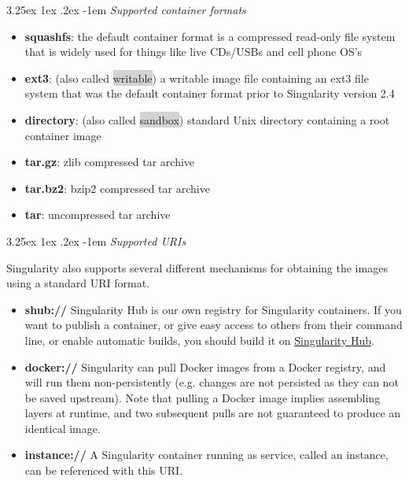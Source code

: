 \documentclass[a4paper]{article}
\makeatletter
\newcounter{subsubsubsection}[subsubsection]
\renewcommand\paragraph{\@startsection{paragraph}{5}{\z@}%
  {3.25ex \@plus1ex \@minus.2ex}%
  {-1em}%
  {\normalfont\normalsize\bfseries}}
\makeatother
\begin{document}
\paragraph{\textit{Supported container formats}}
\begin{itemize}	
	\item \textbf{squashfs}: the default container format is a compressed read-only file system that is widely used for things like live CDs/USBs and cell phone OS’s
\item \textbf{ext3}: (also called \colorbox{lightgray}{writable}) a writable image file containing an ext3 file system that was the default container format prior to Singularity version 2.4
\item \textbf{directory}: (also called \colorbox{lightgray}{sandbox}) standard Unix directory containing a root container image
\item \textbf{tar.gz}: zlib compressed tar archive
\item \textbf{tar.bz2}: bzip2 compressed tar archive
\item \textbf{tar}: uncompressed tar archive
\end{itemize}
\paragraph{\textit{Supported URIs}}
	
	Singularity also supports several different mechanisms for obtaining the images using a standard URI format.

\begin{itemize}
\item \textbf{shub://} Singularity Hub is our own registry for Singularity containers. If you want to publish a container, or give easy access to others from their command line, or enable automatic builds, you should build it on \href{https://singularity-hub.org/}{Singularity Hub}.
\item \textbf{docker://} Singularity can pull Docker images from a Docker registry, and will run them non-persistently (e.g. changes are not persisted as they can not be saved upstream). Note that pulling a Docker image implies assembling layers at runtime, and two subsequent pulls are not guaranteed to produce an identical image.
\item \textbf{instance://} A Singularity container running as service, called an instance, can be referenced with this URI.
\end{itemize}
	
\end{document}
